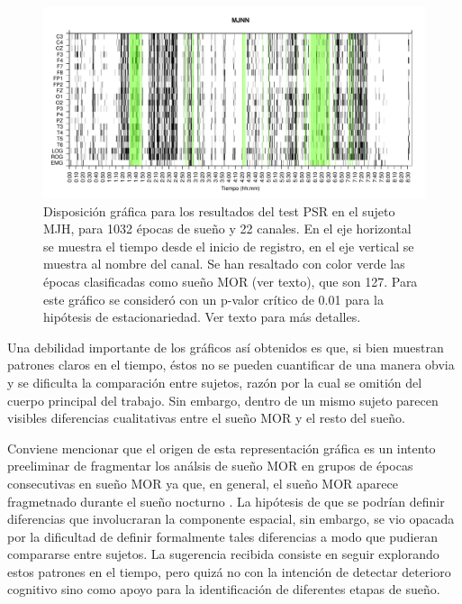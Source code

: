 \begin{figure}
\includegraphics[width=\textwidth]{MJNNVIGILOS_127_mor127_tot1032_esttotal.pdf} 
\caption{Disposici\'on gr\'afica para los resultados del test PSR en el sujeto MJH, 
para 1032 \'epocas de sue\~no y 22 canales. 
En el eje horizontal se muestra el tiempo desde el inicio de registro, en el eje vertical se muestra al 
nombre del canal. 
Se han resaltado con color verde las \'epocas clasificadas como sue\~no MOR (ver texto), que son 127.
Para este gr\'afico se consider\'o con un p-valor cr\'itico de 0.01 para la hip\'otesis
de estacionariedad. Ver texto para m\'as detalles.}
\label{ejemplo1}
\end{figure}

Una debilidad importante de los gr\'aficos as\'i obtenidos es que, si bien muestran patrones 
claros en el tiempo, \'estos no se pueden cuantificar de una manera obvia y se dificulta la
comparaci\'on entre sujetos, raz\'on por la cual se omiti\'on del cuerpo principal del trabajo. 
Sin embargo, dentro de un mismo sujeto parecen visibles diferencias cualitativas
entre el sue\~no MOR y el resto del sue\~no.

Conviene mencionar que el origen de esta representaci\'on gr\'afica es un intento preeliminar de
fragmentar los an\'alsis de sue\~no MOR en grupos de \'epocas consecutivas en sue\~no MOR ya que,
en general, el sue\~no MOR aparece fragmetnado durante el sue\~no nocturno \cite{CarrilloMora}.
La hip\'otesis de que se podr\'ian definir diferencias que involucraran la componente espacial,
sin embargo, se vio opacada por la dificultad de definir formalmente tales diferencias a modo
que pudieran compararse entre sujetos.
La sugerencia recibida consiste en seguir explorando estos patrones en el tiempo, pero quiz\'a
no con la intenci\'on de detectar deterioro cognitivo sino como apoyo para la identificaci\'on de
diferentes etapas de sue\~no.


